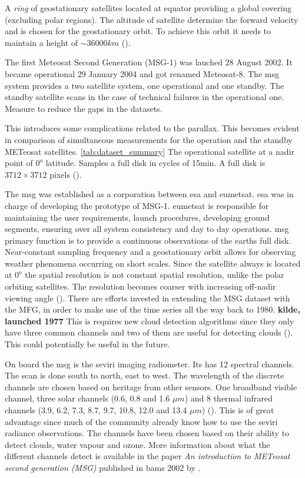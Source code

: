 A \textit{ring} of geostationary satellites located at equator providing a global covering (excluding polar regions). The altitude of satellite determine the forward velocity and is chosen for the geostationary orbit. To achieve this orbit it needs to maintain a height of $\sim 36 000km$ (\cite{Bley2013ASEVIRI}). 

The first Meteosat Second Generation (MSG-1) was lauched 28 August 2002. It became operational 29 January 2004 and got renamed Meteosat-8. The \acrshort{msg} system provides a two satellite system, one operational and one standby. The standby satellite scans in the case of technical failures in the operational one. Measure to reduce the gaps in the datasets. 

This introduces some complications related to the parallax. This becomes evident in comparison of  simultaneous measurements for the operation and the standby METeosat satellites. \ref{tab:dataset_summary} The operational satellite at a nadir point of $0^o$ latitude. Samples a full disk in cycles of 15min. A full disk is $3712\times 3712$ pixels (\cite{Schmetz_meteosat_intro}).

The \acrfull{msg} was established as a corporation between \acrfull{esa} and \acrfull{eumetsat}. \acrshort{esa} was in charge of developing the prototype of MSG-1. \acrshort{eumetsat} is responsible for maintaining the user requirements, launch procedures, developing ground segments, ensuring over all system consistency and day to day operations.  \acrshort{msg} primary function is to provide a continuous observations of the earths full disk. Near-constant sampling frequency and a geostationary orbit allows for observing weather phenomena occurring on short scales. Since the satellite always is located at $0^o$ the spatial resolution is not constant spatial resolution, unlike the polar orbiting satellites. The resolution becomes coarser with increasing off-nadir viewing angle (\cite{Stubenrauch2013AssessmentPanel}). There are efforts invested in extending the MSG dataset with the MFG, in order to make use of the time series all the way back to 1980. \textbf{kilde, launched 1977} This is requires new cloud detection algorithms since they only have three common channels and two of them are useful for detecting clouds (\cite{Stockli2019CloudApplications}). This could potentially be useful in the future. 

On board the \acrshort{msg} is the \acrfull{seviri} imaging radiometer. Its has  12 spectral channels. The scan is done south to north, east to west. The wavelength of the discrete channels are chosen based on heritage from other sensors. One broadband visible channel, three solar channels (0.6, 0.8 and 1.6 $\mu m$) and 8 thermal infrared channels (3.9, 6.2, 7.3, 8.7, 9.7, 10.8, 12.0 and 13.4 $\mu m$) (\cite{Taravat2015MultilayerMasking}). This is of great advantage since much of the community already know how to use the \acrshort{seviri} radiance observations. The channels have been chosen based on their ability to detect clouds, water vapour and ozone. More information about what the different channels detect is available in the paper \textit{An introduction to METeosat second generation (MSG)} published in \acrshort{bams} 2002 by \citeauthor{Schmetz_meteosat_intro}.

